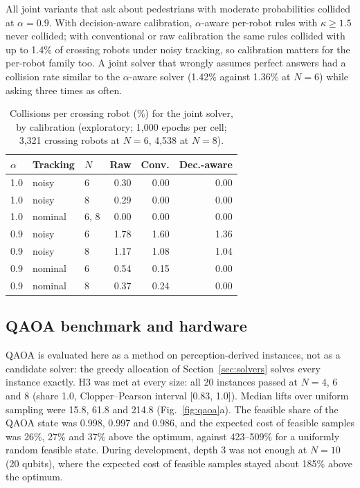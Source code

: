 \documentclass[a4paper,fleqn]{cas-dc}
\begin{document}
All joint variants that ask about pedestrians with moderate probabilities collided at $\alpha = 0.9$. With decision-aware calibration, $\alpha$-aware per-robot rules with $\kappa \ge 1.5$ never collided; with conventional or raw calibration the same rules collided with up to 1.4\% of crossing robots under noisy tracking, so calibration matters for the per-robot family too. A joint solver that wrongly assumes perfect answers had a collision rate similar to the $\alpha$-aware solver (1.42\% against 1.36\% at $N = 6$) while asking three times as often.

\begin{table}
\centering
\caption{Collisions per crossing robot (\%) for the joint solver, by calibration (exploratory; 1{,}000 epochs per cell; 3{,}321 crossing robots at $N = 6$, 4{,}538 at $N = 8$).}
\label{tab:calib}
\begin{tabular*}{\columnwidth}{@{\extracolsep{\fill}}lllrrr}
\toprule
$\alpha$ & Tracking & $N$ & Raw & Conv. & Dec.-aware \\
\midrule
1.0 & noisy & 6 & 0.30 & 0.00 & 0.00 \\
1.0 & noisy & 8 & 0.29 & 0.00 & 0.00 \\
1.0 & nominal & 6, 8 & 0.00 & 0.00 & 0.00 \\
0.9 & noisy & 6 & 1.78 & 1.60 & 1.36 \\
0.9 & noisy & 8 & 1.17 & 1.08 & 1.04 \\
0.9 & nominal & 6 & 0.54 & 0.15 & 0.00 \\
0.9 & nominal & 8 & 0.37 & 0.24 & 0.00 \\
\bottomrule
\end{tabular*}
\end{table}

\subsection{QAOA benchmark and hardware}
\label{sec:res-qaoa}

QAOA is evaluated here as a method on perception-derived instances, not as a candidate solver: the greedy allocation of Section~\ref{sec:solvers} solves every instance exactly. H3 was met at every size: all 20 instances passed at $N = 4$, 6 and 8 (share 1.0, Clopper--Pearson interval [0.83, 1.0]). Median lifts over uniform sampling were 15.8, 61.8 and 214.8 (Fig.~\ref{fig:qaoa}a). The feasible share of the QAOA state was 0.998, 0.997 and 0.986, and the expected cost of feasible samples was 26\%, 27\% and 37\% above the optimum, against 423--509\% for a uniformly random feasible state. During development, depth 3 was not enough at $N = 10$ (20 qubits), where the expected cost of feasible samples stayed about 185\% above the optimum.
\end{document}
